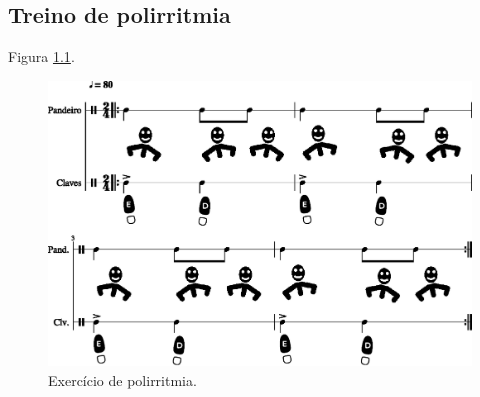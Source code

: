 

\chapter{\textcolor{red}{ \Bodyisolation}}



\section{  Treino de polirritmia}

\cite[pp. 93]{alves2004teoria}
Figura \ref{fig:bodycontrol1-poliritmia-1}.

\begin{figure}[!h]
  \centering
    \includegraphics[width=1.0\textwidth]{chapters/cap-body-isolation/bodycontrol1-poliritmia-1.eps}
\caption{Exercício de polirritmia.}
\label{fig:bodycontrol1-poliritmia-1}
\end{figure}



